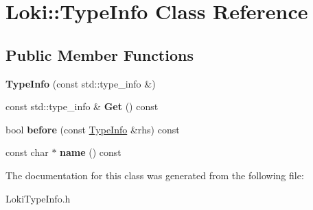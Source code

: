 \hypertarget{classLoki_1_1TypeInfo}{}\section{Loki\+:\+:Type\+Info Class Reference}
\label{classLoki_1_1TypeInfo}
\subsection*{Public Member Functions}
\begin{DoxyCompactItemize}
\item 
{\bfseries Type\+Info} (const std\+::type\+\_\+info \&)\hypertarget{classLoki_1_1TypeInfo_a42fe2c6f366015ca70f93257e4ab95db}{}\label{classLoki_1_1TypeInfo_a42fe2c6f366015ca70f93257e4ab95db}

\item 
const std\+::type\+\_\+info \& {\bfseries Get} () const \hypertarget{classLoki_1_1TypeInfo_a50b5b6154f190e2fc0cfa4edaa006109}{}\label{classLoki_1_1TypeInfo_a50b5b6154f190e2fc0cfa4edaa006109}

\item 
bool {\bfseries before} (const \hyperlink{classLoki_1_1TypeInfo}{Type\+Info} \&rhs) const \hypertarget{classLoki_1_1TypeInfo_aa8c8335a706e97632c1735826e20997c}{}\label{classLoki_1_1TypeInfo_aa8c8335a706e97632c1735826e20997c}

\item 
const char $\ast$ {\bfseries name} () const \hypertarget{classLoki_1_1TypeInfo_a526d5880cde7990cde678aeb1401dbc8}{}\label{classLoki_1_1TypeInfo_a526d5880cde7990cde678aeb1401dbc8}

\end{DoxyCompactItemize}


The documentation for this class was generated from the following file\+:\begin{DoxyCompactItemize}
\item 
Loki\+Type\+Info.\+h\end{DoxyCompactItemize}

